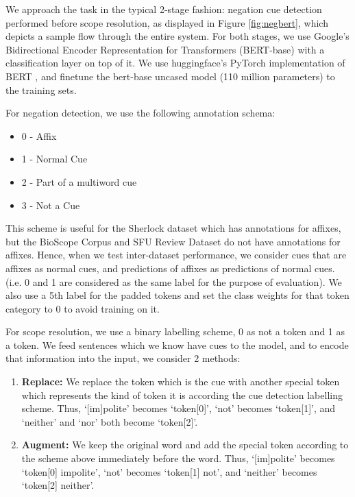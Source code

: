 \documentclass[10pt, a4paper]{article}
\begin{document}
We approach the task in the typical 2-stage fashion: negation cue detection performed before scope resolution, as displayed in Figure \ref{fig:negbert}, which depicts a sample flow through the entire system. For both stages, we use Google’s Bidirectional Encoder Representation for Transformers \cite{bert} (BERT-base) with a classification layer on top of it. We use huggingface’s PyTorch implementation of BERT \cite{Wolf2019HuggingFacesTS}, and finetune the bert-base uncased model (110 million parameters) to the training sets.
\par For negation detection, we use the following annotation schema:
\begin{itemize}[noitemsep]
    \item 0 - Affix
    \item 1 - Normal Cue
    \item 2 - Part of a multiword cue
    \item 3 - Not a Cue
\end{itemize}
\par This scheme is useful for the Sherlock dataset which has annotations for affixes, but the BioScope Corpus and SFU Review Dataset do not have annotations for affixes. Hence, when we test inter-dataset performance, we consider cues that are affixes as normal cues, and predictions of affixes as predictions of normal cues. (i.e. 0 and 1 are considered as the same label for the purpose of evaluation). We also use a 5th label for the padded tokens and set the class weights for that token category to 0 to avoid training on it. 
\par For scope resolution, we use a binary labelling scheme, 0 as not a token and 1 as a token. We feed sentences which we know have cues to the model, and to encode that information into the input, we consider 2 methods:
\begin{enumerate}[noitemsep]
    \item \textbf{Replace:} We replace the token which is the cue with another special token which represents the kind of token it is according the cue detection labelling scheme. Thus, ‘[im]polite’ becomes ‘token[0]’, ‘not’ becomes ‘token[1]’, and	‘neither’ and ‘nor’ both become ‘token[2]’.
    \item \textbf{Augment:} We keep the original word and add the special token according to the scheme above immediately before the word. Thus, ‘[im]polite’ becomes ‘token[0] impolite’, ‘not’ becomes ‘token[1] not’, and ‘neither’ becomes ‘token[2] neither’.
\end{enumerate}
\end{document}
